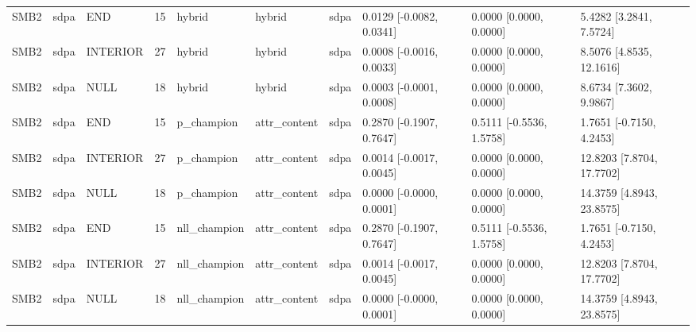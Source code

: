 \begin{tabular}{llllllllll}
SMB2 & sdpa & END & 15 & hybrid & hybrid & sdpa & 0.0129 [-0.0082, 0.0341] & 0.0000 [0.0000, 0.0000] & 5.4282 [3.2841, 7.5724] \\
SMB2 & sdpa & INTERIOR & 27 & hybrid & hybrid & sdpa & 0.0008 [-0.0016, 0.0033] & 0.0000 [0.0000, 0.0000] & 8.5076 [4.8535, 12.1616] \\
SMB2 & sdpa & NULL & 18 & hybrid & hybrid & sdpa & 0.0003 [-0.0001, 0.0008] & 0.0000 [0.0000, 0.0000] & 8.6734 [7.3602, 9.9867] \\
SMB2 & sdpa & END & 15 & p\_champion & attr\_content & sdpa & 0.2870 [-0.1907, 0.7647] & 0.5111 [-0.5536, 1.5758] & 1.7651 [-0.7150, 4.2453] \\
SMB2 & sdpa & INTERIOR & 27 & p\_champion & attr\_content & sdpa & 0.0014 [-0.0017, 0.0045] & 0.0000 [0.0000, 0.0000] & 12.8203 [7.8704, 17.7702] \\
SMB2 & sdpa & NULL & 18 & p\_champion & attr\_content & sdpa & 0.0000 [-0.0000, 0.0001] & 0.0000 [0.0000, 0.0000] & 14.3759 [4.8943, 23.8575] \\
SMB2 & sdpa & END & 15 & nll\_champion & attr\_content & sdpa & 0.2870 [-0.1907, 0.7647] & 0.5111 [-0.5536, 1.5758] & 1.7651 [-0.7150, 4.2453] \\
SMB2 & sdpa & INTERIOR & 27 & nll\_champion & attr\_content & sdpa & 0.0014 [-0.0017, 0.0045] & 0.0000 [0.0000, 0.0000] & 12.8203 [7.8704, 17.7702] \\
SMB2 & sdpa & NULL & 18 & nll\_champion & attr\_content & sdpa & 0.0000 [-0.0000, 0.0001] & 0.0000 [0.0000, 0.0000] & 14.3759 [4.8943, 23.8575] \\
\hline
\end{tabular}
